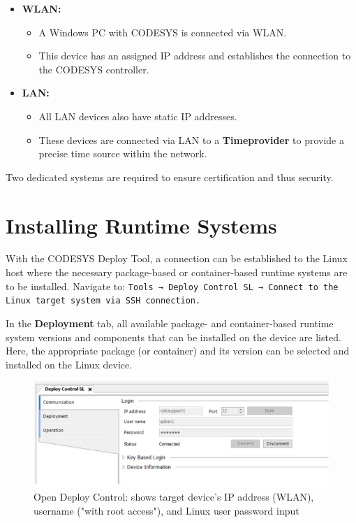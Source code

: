\documentclass[a4paper,12pt]{article}
\begin{document}
\begin{itemize}
	\item \textbf{WLAN:}
	\begin{itemize}
		\item A Windows PC with CODESYS is connected via WLAN.
		\item This device has an assigned IP address and establishes the connection to the CODESYS controller.
	\end{itemize}
	
	\item \textbf{LAN:}
	\begin{itemize}
		\item All LAN devices also have static IP addresses.
		\item These devices are connected via LAN to a \textbf{Timeprovider} to provide a precise time source within the network.
	\end{itemize}
\end{itemize}

Two dedicated systems are required to ensure certification and thus security.

\newpage
\section{Installing Runtime Systems}


With the CODESYS Deploy Tool, a connection can be established to the Linux host where the necessary package-based or container-based runtime systems are to be installed.  
Navigate to:  
\texttt{Tools → Deploy Control SL → Connect to the Linux target system via SSH connection.}


In the \textbf{Deployment} tab, all available package- and container-based runtime system versions and components that can be installed on the device are listed.  
Here, the appropriate package (or container) and its version can be selected and installed on the Linux device.

\begin{figure}[H]
	\centering
	\includegraphics[width=1\textwidth]{3.jpg}
	\caption{Open Deploy Control: shows target device's IP address (WLAN), username ("with root access"), and Linux user password input}
\end{figure}
\end{document}
